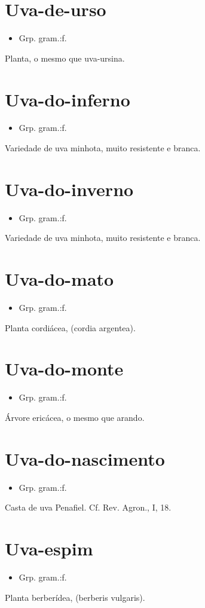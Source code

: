 \documentclass{article}
\begin{document}
\section{Uva-de-urso}
\begin{itemize}
\item {Grp. gram.:f.}
\end{itemize}
Planta, o mesmo que \textunderscore uva-ursina\textunderscore .
\section{Uva-do-inferno}
\begin{itemize}
\item {Grp. gram.:f.}
\end{itemize}
Variedade de uva minhota, muito resistente e branca.
\section{Uva-do-inverno}
\begin{itemize}
\item {Grp. gram.:f.}
\end{itemize}
Variedade de uva minhota, muito resistente e branca.
\section{Uva-do-mato}
\begin{itemize}
\item {Grp. gram.:f.}
\end{itemize}
Planta cordiácea, (\textunderscore cordia argentea\textunderscore ).
\section{Uva-do-monte}
\begin{itemize}
\item {Grp. gram.:f.}
\end{itemize}
Árvore ericácea, o mesmo que \textunderscore arando\textunderscore .
\section{Uva-do-nascimento}
\begin{itemize}
\item {Grp. gram.:f.}
\end{itemize}
Casta de uva Penafiel. Cf. \textunderscore Rev. Agron.\textunderscore , I, 18.
\section{Uva-espim}
\begin{itemize}
\item {Grp. gram.:f.}
\end{itemize}
Planta berberídea, (\textunderscore berberis vulgaris\textunderscore ).
\end{document}
